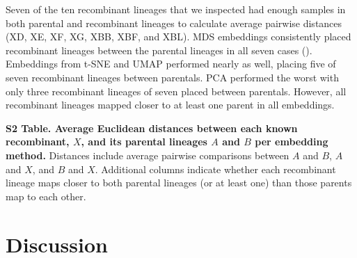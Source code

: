 \documentclass[10pt,letterpaper]{article}
\begin{document}
Seven of the ten recombinant lineages that we inspected had enough samples in both parental and recombinant lineages to calculate average pairwise distances (XD, XE, XF, XG, XBB, XBF, and XBL).
MDS embeddings consistently placed recombinant lineages between the parental lineages in all seven cases ().
Embeddings from t-SNE and UMAP performed nearly as well, placing five of seven recombinant lineages between parentals.
PCA performed the worst with only three recombinant lineages of seven placed between parentals.
However, all recombinant lineages mapped closer to at least one parent in all embeddings.

\begin{table}[!ht]
\centering
\caption*{
  {\bf S2 Table. Average Euclidean distances between each known recombinant, $X$, and its parental lineages $A$ and $B$ per embedding method.}
  Distances include average pairwise comparisons between $A$ and $B$, $A$ and $X$, and $B$ and $X$.
  Additional columns indicate whether each recombinant lineage maps closer to both parental lineages (or at least one) than those parents map to each other.}
\scalebox{0.5}{
  
}
\end{table}

\section*{Discussion}
\end{document}
